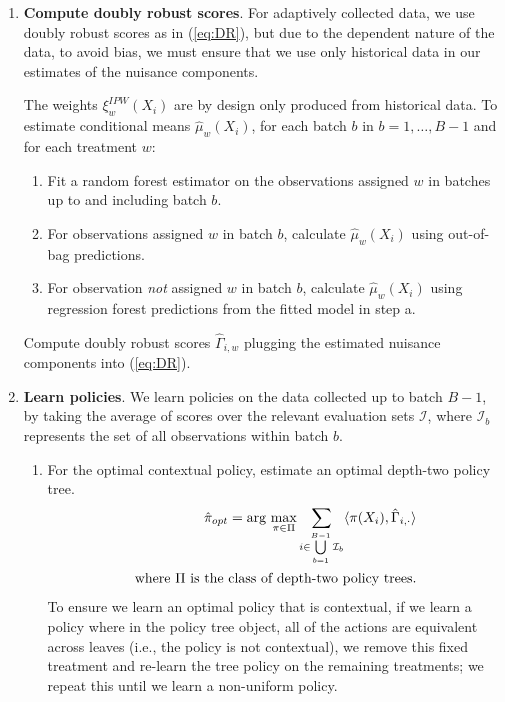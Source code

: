 \documentclass[letterpaper, 12pt, parskip=full,DIV=10]{scrartcl}
\begin{document}
\begin{enumerate}
\item \textbf{Compute doubly robust scores}. For adaptively collected data, we use doubly robust scores as in (\ref{eq:DR}), but due to the dependent nature of the data, to avoid bias, we must ensure that we use only historical data in our estimates of the nuisance components. 

The weights $\xi^{IPW}_w(X_i)$ are by design only produced from historical data. To estimate conditional means $\hat \mu_w(X_i)$, for each batch $b$ in $b = 1, \dots, B-1$ and for each treatment $w$:
\begin{enumerate}
\item Fit a random forest estimator on the observations assigned $w$ in batches up to and including batch $b$. 
\item For observations assigned $w$ in batch $b$, calculate $\hat\mu_w(X_i)$ using out-of-bag predictions. 
\item For observation \textit{not} assigned $w$ in batch $b$, calculate $\hat\mu_w(X_i)$ using regression forest predictions from the fitted model in step a. 
\end{enumerate}

 Compute doubly robust scores $\hat{\Gamma}_{i,w}$ plugging the estimated nuisance components into (\ref{eq:DR}). 
\item \textbf{Learn policies}. We learn policies on the data collected up to batch $B-1$, by taking the average of scores over the relevant evaluation sets $\mathcal{I}$, where $\mathcal{I}_b$ represents the set of all observations within batch $b$.
\begin{enumerate}
\item For the optimal contextual policy, estimate an optimal depth-two policy tree. 
    \begin{align*}
      \hat{\pi}_{opt} = \arg\max_{\pi \in \Pi}
      \sum_{i \in \bigcup\limits_{b=1}^{B-1} \mathcal{I}_{b} }
      \langle \pi(X_{i}), \hat{\Gamma}_{i, \cdot} \rangle \\
       \text{where } \Pi \text{ is the class of depth-\textcolor{black}{two} policy trees.}
    \end{align*}
    To ensure we learn an optimal policy that is contextual, if we learn a policy where in the policy tree object, all of the actions are equivalent across leaves (i.e., the policy is not contextual), we remove this fixed treatment and re-learn the tree policy on the remaining treatments; we repeat this until we learn a non-uniform policy. 
    

\end{enumerate}
\end{enumerate}
\end{document}
